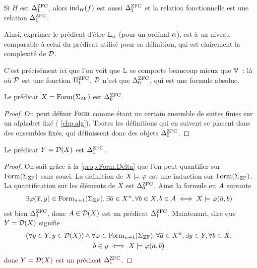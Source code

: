 \begin{remark}
  Si $H$ est $\Delta_{1}^{\operatorname{ZFC}}$, alors $\operatorname{ind}_H(f)$ est aussi $\Delta_{1}^{\operatorname{ZFC}}$ et la
  relation fonctionnelle est une relation $\Delta_{1}^{\operatorname{ZFC}}$.
\end{remark}

Ainsi, exprimer le prédicat d'être $\mathbb L_\alpha$ (pour un ordinal $\alpha$),
est à un niveau comparable à celui du prédicat utilisé pour sa définition, qui
est clairement la complexité de $\mathcal{D}$.

C'est précisément ici que l'on voit que $\mathbb L$ se comporte beaucoup mieux
que $\mathbb V$~: là où $\mathcal{P}$ est une fonction $\Pi_{1}^{\operatorname{ZFC}}$, $\mathcal{D}$ n'est
que $\Delta_{0}^{\operatorname{ZFC}}$, qui est une formule absolue.

\begin{property}\label{prop.Form.Delta}
  Le prédicat $X = \operatorname{Form}(\Sigma_{\operatorname{ZF}})$ est $\Delta_{0}^{\operatorname{ZFC}}$.
\end{property}

\begin{proof}
  On peut définir $\operatorname{Form}$ comme étant un certain ensemble de suites finies
  sur un alphabet fixé ( \cref{chp.alg}). Toutes les définitions
  qui en suivent se placent dans des ensembles fixés, qui définissent donc des
  objets $\Delta_{0}^{\operatorname{ZFC}}$.
\end{proof}

\begin{property}
  Le prédicat $Y = \mathcal{D}(X)$ est $\Delta_{1}^{\operatorname{ZFC}}$.
\end{property}

\begin{proof}
  On sait grâce à la \cref{prop.Form.Delta} que l'on peut quantifier
  sur $\operatorname{Form}(\Sigma_{\operatorname{ZF}})$ sans souci. La définition de $X\models \varphi$ est
  une induction sur $\operatorname{Form}(\Sigma_{\operatorname{ZF}})$. La quantification sur les éléments
  de $X$ est $\Delta_{0}^{\operatorname{ZFC}}$. Ainsi la formule en $A$ suivante
  \[\exists \varphi(\overline{x},y)\in\operatorname{Form}_{n+1}(\Sigma_{\operatorname{ZF}}),
  \exists \overline{a}\in X^n, \forall b\in X, \\
  b\in A \iff X\models \varphi(\overline{a},b)\]
  est bien $\Delta_{1}^{\operatorname{ZFC}}$, donc $A\in \mathcal{D}(X)$ est un prédicat
  $\Delta_{1}^{\operatorname{ZFC}}$. Maintenant, dire que $Y = \mathcal{D}(X)$ signifie
  \begin{multline*}
    (\forall y \in Y, y \in \mathcal{D}(X)) \land
    \forall \varphi\in\operatorname{Form}_{n+1}(\Sigma_{\operatorname{ZF}}),
    \forall \overline{a} \in X^n, \exists y \in Y, \forall b \in X,\\
    b \in y \iff X\models \varphi(\overline{a},b)
  \end{multline*}
  donc $Y = \mathcal{D}(X)$ est un prédicat $\Delta_{1}^{\operatorname{ZFC}}$.
\end{proof}

